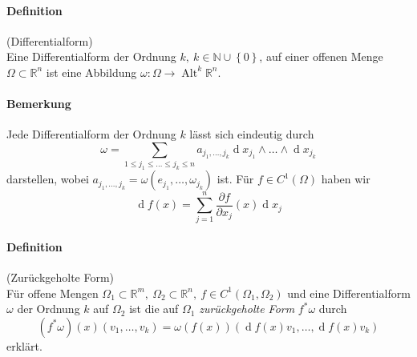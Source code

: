 \documentclass[12pt,a4paper,fleqn]{article}
\def\set#1{{\left\{ #1 \right\}}}
\def\R{{\mathbb{R}}}
\def\d{{\operatorname{d}}}
\begin{document}
\paragraph{Definition} (Differentialform)\\
Eine Differentialform der Ordnung $k,\ k \in\mathbb{N} \cup \set{0}$, auf einer offenen Menge $\Omega \subset \R^n$ ist eine Abbildung $\omega\colon \Omega \rightarrow \operatorname{Alt}^k \R^n$.

\paragraph{Bemerkung} Jede Differentialform der Ordnung $k$ lässt sich eindeutig durch 
\begin{displaymath}
\omega = \sum_{1 \leq j_1 \leq \dots \leq j_k \leq n} a_{j_1, \dots, j_k} \d x_{j_1}\wedge\dots\wedge\d x_{j_k}
\end{displaymath}
darstellen, wobei $a_{j_1, \dots, j_k} = \omega(e_{j_1}, \dots, \omega_{j_k})$ ist. Für $f \in C^1(\Omega)$ haben wir 
\begin{displaymath}
\d f(x) = \sum_{j=1}^n \frac{\partial f}{\partial x_j}(x) \d x_j
\end{displaymath}

\paragraph{Definition} (Zurückgeholte Form)\\
Für offene Mengen $\Omega_1 \subset \R^m,\ \Omega_2 \subset \R^n,\ f \in C^1(\Omega_1, \Omega_2)$ und eine Differentialform $\omega$ der Ordnung $k$ auf $\Omega_2$ ist die auf $\Omega_1$ \textit{zurückgeholte Form} $f^\ast\omega$ durch 
\begin{displaymath}
(f^\ast\omega)(x)(v_1, \dots, v_k)=\omega(f(x))(\d f(x)v_1, \dots, \d f(x)v_k)
\end{displaymath}
erklärt.
\end{document}

